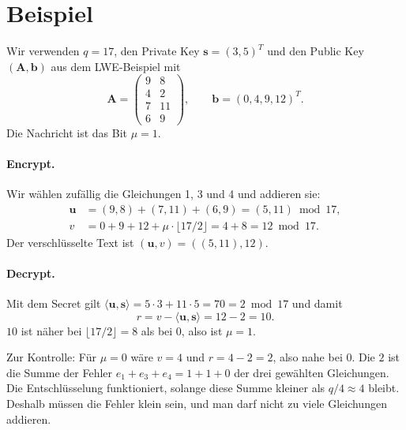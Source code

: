 \section{Beispiel}
Wir verwenden $q = 17$, den Private Key $\mathbf{s} = (3, 5)^T$ und den Public Key $(\mathbf{A}, \mathbf{b})$ aus dem LWE-Beispiel mit
\[
    \mathbf{A} = \begin{pmatrix} 9 & 8 \\ 4 & 2 \\ 7 & 11 \\ 6 & 9 \end{pmatrix},
    \qquad
    \mathbf{b} = (0, 4, 9, 12)^T.
\]
Die Nachricht ist das Bit $\mu = 1$.

\paragraph{Encrypt.} Wir wählen zufällig die Gleichungen 1, 3 und 4 und addieren sie:
\begin{align*}
    \mathbf{u} &= (9, 8) + (7, 11) + (6, 9) = (5, 11) \bmod 17, \\
    v &= 0 + 9 + 12 + \mu \cdot \lfloor 17/2 \rfloor = 4 + 8 = 12 \bmod 17.
\end{align*}
Der verschlüsselte Text ist $(\mathbf{u}, v) = ((5, 11), 12)$.

\paragraph{Decrypt.} Mit dem Secret gilt $\langle \mathbf{u}, \mathbf{s} \rangle = 5 \cdot 3 + 11 \cdot 5 = 70 = 2 \bmod 17$ und damit
\[
    r = v - \langle \mathbf{u}, \mathbf{s} \rangle = 12 - 2 = 10.
\]
$10$ ist näher bei $\lfloor 17/2 \rfloor = 8$ als bei $0$, also ist $\mu = 1$.

Zur Kontrolle: Für $\mu = 0$ wäre $v = 4$ und $r = 4 - 2 = 2$, also nahe bei $0$. Die $2$ ist die Summe der Fehler $e_1 + e_3 + e_4 = 1 + 1 + 0$ der drei gewählten Gleichungen. Die Entschlüsselung funktioniert, solange diese Summe kleiner als $q/4 \approx 4$ bleibt. Deshalb müssen die Fehler klein sein, und man darf nicht zu viele Gleichungen addieren.
